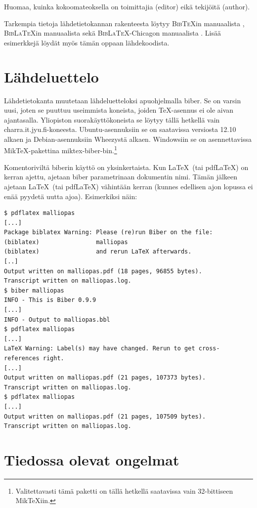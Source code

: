 \documentclass[utf8]{gradu3}
\begin{document}
Huomaa, kuinka kokoomateoksella on toimittajia (editor) eikä tekijöitä
(author).

Tarkempia tietoja lähdetietokannan rakenteesta löytyy
\textsc{Bib\TeX}in manuaalista \parencite{bibtexing},
\textsc{Bib\LaTeX}in manuaalista \parencite[luku~2]{biblatex-manual}
sekä \textsc{Bib\LaTeX}-Chicagon manuaalista
\parencite[luvut 5.1--5.2]{biblatex-chicago-manual}.  Lisää
esimerkkejä löydät myös tämän oppaan lähdekoodista.

\section{Lähdeluettelo}

Lähdetietokanta muutetaan lähdeluetteloksi apuohjelmalla {biber}.  Se
on varsin uusi, joten se puuttuu useimmista koneista, joiden
\TeX-asennus ei ole aivan ajantasalla.  Yliopiston suorakäyttökoneista
se löytyy tällä hetkellä vain charra.it.jyu.fi-koneesta.
Ubuntu-asennuksiin se on saatavissa versiosta 12.10 alkaen ja
Debian-asennuksiin Wheezystä alkaen.  Windowsiin se on asennettavissa
Mik\TeX-pakettina miktex-biber-bin.\footnote{Valitettavasti tämä
  paketti on tällä hetkellä saatavissa vain 32-bittiseen Mik\TeX iin.}

Komentoriviltä biberin käyttö on yksinkertaista.  Kun \LaTeX\ (tai
pdf\LaTeX) on kerran ajettu, ajetaan biber parametrinaan dokumentin
nimi.  Tämän jälkeen ajetaan \LaTeX\ (tai pdf\LaTeX) vähintään kerran
(kunnes edellisen ajon lopussa ei enää pyydetä uutta ajoa).
Esimerkiksi näin:

\begingroup\footnotesize
\begin{verbatim}
$ pdflatex malliopas
[...]
Package biblatex Warning: Please (re)run Biber on the file:
(biblatex)                malliopas
(biblatex)                and rerun LaTeX afterwards.
[..]
Output written on malliopas.pdf (18 pages, 96855 bytes).
Transcript written on malliopas.log.
$ biber malliopas
INFO - This is Biber 0.9.9
[...]
INFO - Output to malliopas.bbl
$ pdflatex malliopas
[...]
LaTeX Warning: Label(s) may have changed. Rerun to get cross-references right.
[...]
Output written on malliopas.pdf (21 pages, 107373 bytes).
Transcript written on malliopas.log.
$ pdflatex malliopas
[...]
Output written on malliopas.pdf (21 pages, 107509 bytes).
Transcript written on malliopas.log.
\end{verbatim}
\endgroup

\section{Tiedossa olevat ongelmat}
\end{document}
